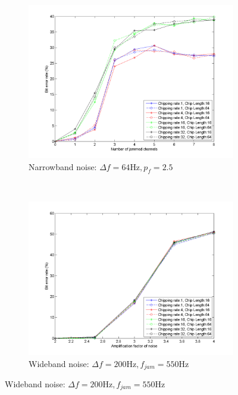 			\begin{figure}[H]
				\centering
				\begin{subfigure}[b]{0.5\textwidth}
					\includegraphics[width=\textwidth]{imgs/results/plot_mode_fhss-test_narrowband-rep_20-dataRate_8-dataLength_128.png}
					\caption{Narrowband noise: $\Delta f= 64 \text{Hz}, p_f = 2.5$}
					\label{fig:fhss_narrowband}
				\end{subfigure}%
				~
				\begin{subfigure}[b]{0.5\textwidth}
					\includegraphics[width=\textwidth]{imgs/results/plot_mode_fhss-test_wideband-rep_20-dataRate_8-dataLength_128.png}
					\caption{Wideband noise: $\Delta f= 200 \text{Hz}, f_{jam} = 550\text{Hz}$}
					\label{fig:fhss_wideband}
				\end{subfigure}
			\end{figure}
			
